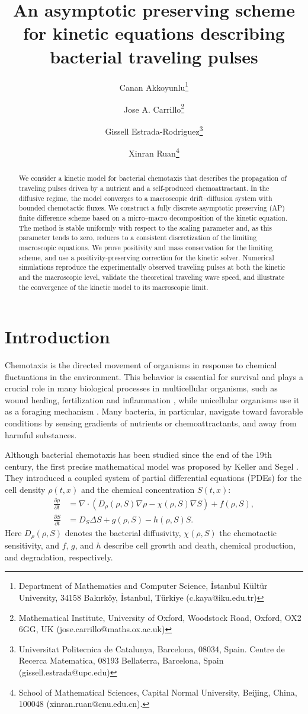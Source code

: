\documentclass[11pt,twoside]{article}
\title{An asymptotic preserving scheme for kinetic equations describing bacterial traveling pulses}
\author{Canan Akkoyunlu\thanks{Department of Mathematics and Computer Science, İstanbul Kültür
University, 34158 Bakırköy, İstanbul, Türkiye (c.kaya@iku.edu.tr)} \and Jose A. Carrillo\thanks{Mathematical Institute, University of Oxford, Woodstock Road, Oxford, OX2 6GG, UK (jose.carrillo@maths.ox.ac.uk)}\and Gissell Estrada-Rodriguez\thanks{Universitat Politecnica de Catalunya, Barcelona, 08034, Spain. Centre de Recerca Matematica, 08193 Bellaterra, Barcelona, Spain (gissell.estrada@upc.edu)} \and  Xinran Ruan\thanks{School of Mathematical Sciences, Capital Normal University, Beijing, China, 100048 (xinran.ruan@cnu.edu.cn). 
} 
}
\date{}
\numberwithin{equation}{section}
\theoremstyle{plain}
\theoremstyle{nonumberplain}
\begin{document}
\maketitle
\begin{abstract}
We consider a kinetic model for bacterial chemotaxis that describes the propagation of traveling pulses driven by a nutrient and a self-produced chemoattractant. In the diffusive regime, the model converges to a macroscopic drift–diffusion system with bounded chemotactic fluxes. We construct a fully discrete asymptotic preserving (AP) finite difference scheme based on a micro–macro decomposition of the kinetic equation. The method is stable uniformly with respect to the scaling parameter and, as this parameter tends to zero, reduces to a consistent discretization of the limiting macroscopic equations. We prove positivity and mass conservation for the limiting scheme, and use a positivity-preserving correction for the kinetic solver. Numerical simulations reproduce the experimentally observed traveling pulses at both the kinetic and the macroscopic level, validate the theoretical traveling wave speed, and illustrate the convergence of the kinetic model to its macroscopic limit.
\end{abstract}

\section{Introduction}


Chemotaxis is the directed movement of organisms in response to chemical fluctuations in the environment. This behavior is essential for survival \cite{franca2006navigating} and plays a crucial role in many biological processes in multicellular organisms, such as wound healing, fertilization and inflammation \cite{rickert2000leukocytes},  while unicellular organisms use it as a foraging mechanism \cite{franca2010g,willard2006signaling}. Many bacteria, in particular, navigate toward favorable conditions by sensing gradients of nutrients or chemoattractants, and away from harmful substances.

Although bacterial chemotaxis has been studied since the end of the 19th century, the first precise mathematical model was proposed by Keller and Segel \cite{keller1971model}. They introduced a coupled system of partial differential equations (PDEs) for the cell density $\rho(t,x)$ and the chemical concentration $S(t,x)$:
\begin{subequations}\label{eq:chemicals}
\begin{align}
\frac{\partial \rho}{\partial t} &= \nabla\cdot (D_\rho (\rho, S) \nabla \rho - \chi (\rho, S) \nabla S) + f(\rho, S),
  \label{eq: KS1}\\
\frac{\partial S}{\partial t} &= D_S \Delta S + g (\rho, S) - h(\rho, S)S.
  \label{eq: KS2}
\end{align}
\end{subequations}
Here $D_\rho(\rho,S)$ denotes the bacterial diffusivity, $\chi(\rho,S)$ the chemotactic
sensitivity, and $f$, $g$, and $h$ describe cell growth and death, chemical production,
and degradation, respectively.
\end{document}
